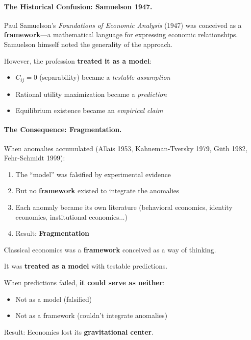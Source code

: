 \paragraph{The Historical Confusion: Samuelson 1947.}
Paul Samuelson's \emph{Foundations of Economic Analysis} (1947) was conceived as a
\textbf{framework}---a mathematical language for expressing economic relationships.
Samuelson himself noted the generality of the approach.

However, the profession \textbf{treated it as a model}:
\begin{itemize}[nosep]
    \item $C_{ij} = 0$ (separability) became a \emph{testable assumption}
    \item Rational utility maximization became a \emph{prediction}
    \item Equilibrium existence became an \emph{empirical claim}
\end{itemize}

\paragraph{The Consequence: Fragmentation.}
When anomalies accumulated (Allais 1953, Kahneman-Tversky 1979, Güth 1982, Fehr-Schmidt 1999):
\begin{enumerate}[nosep]
    \item The ``model'' was falsified by experimental evidence
    \item But no \textbf{framework} existed to integrate the anomalies
    \item Each anomaly became its own literature (behavioral economics, identity economics, institutional economics...)
    \item Result: \textbf{Fragmentation}
\end{enumerate}

\begin{tcolorbox}[colback=red!5!white, colframe=red!75!black,
    title=The Core Problem]
Classical economics was a \textbf{framework} conceived as a way of thinking.

It was \textbf{treated as a model} with testable predictions.

When predictions failed, \textbf{it could serve as neither}:
\begin{itemize}[nosep]
    \item Not as a model (falsified)
    \item Not as a framework (couldn't integrate anomalies)
\end{itemize}
Result: Economics lost its \textbf{gravitational center}.
\end{tcolorbox}


